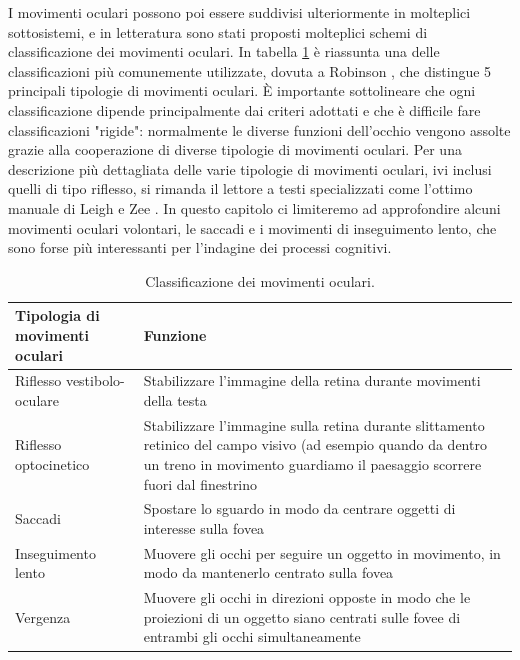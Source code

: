 \documentclass[12pt]{article}
\begin{document}
I movimenti oculari possono poi essere suddivisi ulteriormente in molteplici sottosistemi, e in letteratura sono stati proposti molteplici schemi di classificazione dei movimenti oculari. In tabella \ref{tab1} è riassunta una delle classificazioni più comunemente utilizzate, dovuta a Robinson \cite{Robinson1968}, che distingue 5 principali tipologie di movimenti oculari. È importante sottolineare che ogni classificazione dipende principalmente dai criteri adottati e che è difficile fare classificazioni "rigide": normalmente le diverse funzioni dell'occhio vengono assolte grazie alla cooperazione di diverse tipologie di movimenti oculari. Per una descrizione più dettagliata delle varie tipologie di movimenti oculari, ivi inclusi quelli di tipo riflesso, si rimanda il lettore a testi specializzati come l'ottimo manuale di Leigh e Zee \cite{Leigh2015}. In questo capitolo ci limiteremo ad approfondire alcuni movimenti oculari volontari, le saccadi e i movimenti di inseguimento lento, che sono forse più interessanti per l'indagine dei processi cognitivi.

\begin{table}
\centering
\caption{Classificazione dei movimenti oculari.} \label{tab1}
\begin{tabular}{p{5.3cm}p{8cm}}
  \hline
\textbf{Tipologia di movimenti oculari}  & \textbf{Funzione}\\ 
  \hline  \hline
 Riflesso vestibolo-oculare & Stabilizzare l'immagine della retina durante movimenti della testa \\  \hline
 Riflesso optocinetico & Stabilizzare l'immagine sulla retina durante slittamento retinico del campo visivo (ad esempio quando da dentro un treno in movimento guardiamo il paesaggio scorrere fuori dal finestrino  \\  \hline
  Saccadi & Spostare lo sguardo in modo da centrare oggetti di interesse sulla fovea  \\  \hline
  Inseguimento lento & Muovere gli occhi per seguire un oggetto in movimento, in modo da mantenerlo centrato sulla fovea  \\  \hline
  Vergenza & Muovere gli occhi in direzioni opposte in modo che le proiezioni di un oggetto siano centrati sulle fovee di entrambi gli occhi simultaneamente  \\  \hline
   \hline
\end{tabular}
\end{table}
\end{document}
